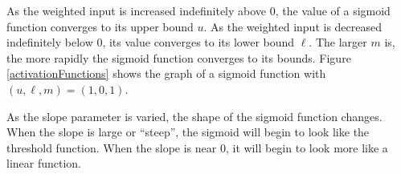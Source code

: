    As the weighted input is increased indefinitely above $0$, the value of a 
sigmoid function converges to its upper bound $u$. As the weighted input is 
decreased indefinitely below $0$, its value converges to its lower bound $\ell$.
The larger $m$ is, the more rapidly the sigmoid function converges to its 
bounds. Figure \ref{activationFunctions} shows the graph of a sigmoid function with 
$(u,\ell,m) = (1,0,1)$. 

As the slope parameter is varied, the shape of the sigmoid function changes. When the slope is
large or ``steep'', the sigmoid will begin to look like the threshold function. When the slope is near $0$, it will begin to look more like a linear function.